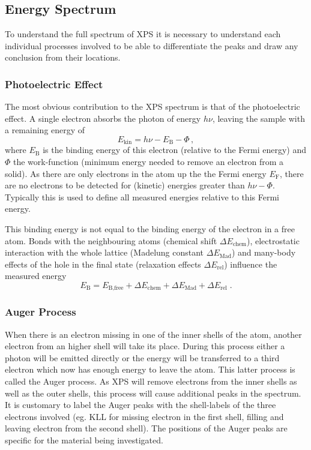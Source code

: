 \documentclass[a4paper]{scrartcl}
\numberwithin{equation}{section}
\numberwithin{figure}{section}
\numberwithin{table}{section}
\newcommand{\eq}[2]{\begin{equation}#1\label{#2}\end{equation}}
\begin{document}
\subsection{Energy Spectrum}
To understand the full spectrum of XPS it is necessary to understand each individual processes involved to be able to differentiate the peaks and draw any conclusion from their locations.


\subsubsection{Photoelectric Effect}
The most obvious contribution to the XPS spectrum is that of the photoelectric effect. A single electron absorbs the photon of energy $h\nu$, leaving the sample with a remaining energy of
\eq{E_\text{kin} = h\nu - E_\text{B} - \Phi \, ,}{}
where $E_\text{B}$ is the binding energy of this electron (relative to the Fermi energy) and $\Phi$ the work-function (minimum energy needed to remove an electron from a solid).
As there are only electrons in the atom up the the Fermi energy $E_\text{F}$, there are no electrons to be detected for (kinetic) energies greater than $h\nu -\Phi$. Typically this is used to define all measured energies relative to this Fermi energy.

This binding energy is not equal to the binding energy of the electron in a free atom. Bonds with the neighbouring atoms (chemical shift $\Delta E_\text{chem}$), electrostatic interaction with the whole lattice (Madelung constant $\Delta E_\text{Mad}$) and many-body effects of the hole in the final state (relaxation effects $\Delta E_\text{rel}$) influence the measured energy
\eq{E_\text{B}=E_\text{B,free} + \Delta E_\text{chem} + \Delta E_\text{Mad} + \Delta E_\text{rel} \; . }{}


\subsubsection{Auger Process}
When there is an electron missing in one of the inner shells of the atom, another electron from an higher shell will take its place. During this process either a photon will be emitted directly or the energy will be transferred to a third electron which now has enough energy to leave the atom. This latter process is called the Auger process. As XPS will remove electrons from the inner shells as well as the outer shells, this process will cause additional peaks in the spectrum. It is customary to label the Auger peaks with the shell-labels of the three electrons involved (eg. KLL for missing electron in the first shell, filling and leaving electron from the second shell). The positions of the Auger peaks are specific for the material being investigated.
\end{document}
